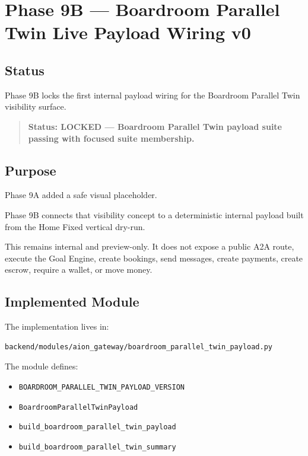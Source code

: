 \section{Phase 9B --- Boardroom Parallel Twin Live Payload Wiring v0}
\label{sec:aion-boardroom-parallel-twin-live-payload-v0}

\subsection{Status}

Phase 9B locks the first internal payload wiring for the Boardroom Parallel Twin visibility surface.

\begin{quote}
\textbf{Status: LOCKED --- Boardroom Parallel Twin payload suite passing with focused suite membership.}
\end{quote}

\subsection{Purpose}

Phase 9A added a safe visual placeholder.

Phase 9B connects that visibility concept to a deterministic internal payload built from the Home Fixed vertical dry-run.

This remains internal and preview-only. It does not expose a public A2A route, execute the Goal Engine, create bookings, send messages, create payments, create escrow, require a wallet, or move money.

\subsection{Implemented Module}

The implementation lives in:

\begin{verbatim}
backend/modules/aion_gateway/boardroom_parallel_twin_payload.py
\end{verbatim}

The module defines:

\begin{itemize}
  \item \texttt{BOARDROOM\_PARALLEL\_TWIN\_PAYLOAD\_VERSION}
  \item \texttt{BoardroomParallelTwinPayload}
  \item \texttt{build\_boardroom\_parallel\_twin\_payload}
  \item \texttt{build\_boardroom\_parallel\_twin\_summary}
\end{itemize}

